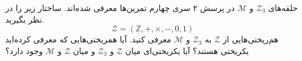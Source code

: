 حلقه‌های 
$\mathcal{Z}_{3}$
و
$\mathcal{M}$
در پرسش ۲ سری چهارم تمرین‌ها معرفی شده‌اند. ساختار زیر را در نظر بگیرید.
\[ \mathcal{Z} = (\mathbb{Z},+,\times,-,0,1) \]
هم‌ریختی‌هایی از 
$\mathcal{Z}$
به 
$\mathcal{Z}_{3}$
و
$\mathcal{M}$
معرفی کنید. آیا همریختی‌هایی که معرفی کرده‌اید یکریختی هستند؟ آیا یکریختی‌ای میان 
$\mathcal{Z}$
و
$\mathcal{Z}_{3}$
و میان
$\mathcal{Z}$
و
$\mathcal{M}$
وجود دارد؟